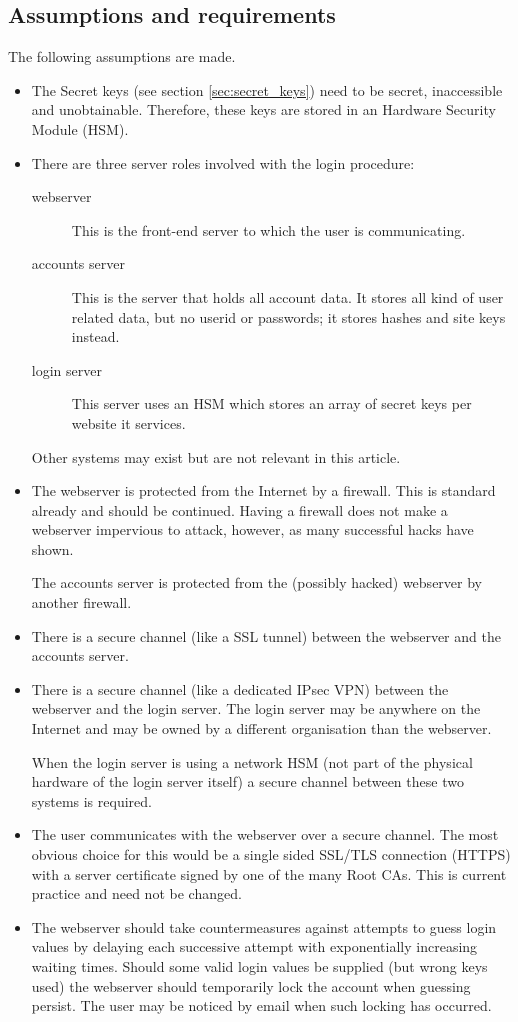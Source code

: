 \subsection{Assumptions and requirements}
The following assumptions are made.
\begin{itemize}
\item	The Secret keys (see section \ref{sec:secret_keys})
need to be secret, inaccessible and unobtainable.
Therefore, these keys are stored in an Hardware Security Module (HSM).
\item	There are three server roles involved with the login procedure:
	\begin{description}
	\item[webserver]	This is the front-end server to which the user is communicating.
	\item[accounts server]	This is the server that holds all account data.
			It stores all kind of user related data, but no userid or passwords;
			it stores hashes and site keys instead.
	\item[login server]	This server uses an HSM which stores an array of secret keys per website it services.
	\end{description}
	Other systems may exist but are not relevant in this article.
\item	The webserver is protected from the Internet by a firewall.
	This is standard already and should be continued.
	Having a firewall does not make a webserver impervious to attack,
	however,
	as many successful hacks have shown.
\par	The accounts server is protected from the
	(possibly hacked)
	webserver by another firewall.
\item	There is a secure channel
	(like a SSL tunnel)
	between the webserver and the accounts server.
\item	There is a secure channel
	(like a dedicated IPsec VPN)
	between the webserver and the login server.
	The login server may be anywhere on the Internet and may be owned by a different organisation than the webserver.
\par	When the login server is using a network HSM
	(not part of the physical hardware of the login server itself)
	a secure channel between these two systems is required.
\item	The user communicates with the webserver over a secure channel.
	The most obvious choice for this would be a single sided SSL/TLS connection
	(HTTPS)
	with a server certificate signed by one of the many Root CAs.
	This is current practice and need not be changed.
\item	The webserver should take countermeasures against attempts to guess
	login values by delaying each successive attempt with exponentially increasing waiting times.
	Should some valid login values be supplied
	(but wrong keys used)
	the webserver should temporarily lock the account when guessing persist.
	The user may be noticed by email when such locking has occurred.
\end{itemize}
\clearpage
